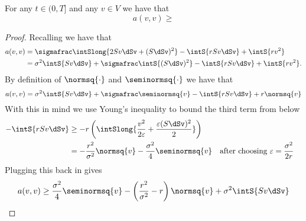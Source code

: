 
\begin{prop}
    For any $t \in (0,T]$ and any $v \in V$ we have that
    \begin{equation*}
        a(v,v) \geq 
    \end{equation*}
    \begin{proof}
        Recalling  we have that
        \begin{align*}
            a(v,v) &= \sigmafrac \intSlong{2Sv \dSv + (S\dSv)^2} - \intS{r S v \dSv} + \intS{r  v^2} \\
            &=  \sigma^2 \intS{Sv \dSv} + \sigmafrac \intS{(S\dSv)^2} - \intS{r S v \dSv} + \intS{r  v^2}.
        \end{align*}
        By definition of $\normsq{\cdot}$ and $\seminormsq{\cdot}$ we have that
        \begin{equation*}
            a(v,v) = \sigma^2 \intS{Sv \dSv} + \sigmafrac \seminormsq{v} - \intS{r S v \dSv} + r \normsq{v}
        \end{equation*}
        With this in mind we use Young's inequality to bound the third term from below
        \begin{align*}
            - \intS{r S v \dSv} & \geq -r \left( \intSlong{\frac{v^2}{2 \varepsilon} + \frac{\varepsilon (S\dSv)^2}{2}}\right)\\
            & = - \frac{r^2}{\sigma^2} \normsq{v} - \frac{\sigma^2}{4}\seminormsq{v}  && \text{after choosing $\varepsilon=\frac{\sigma^2}{2r}$}
        \end{align*}
        Plugging this back in gives
        \begin{equation*}
            a(v,v) \geq \frac{\sigma^2}{4}\seminormsq{v} - \left(\frac{r^2}{\sigma^2} - r \right)\normsq{v} + \sigma^2 \intS{Sv \dSv} 
        \end{equation*}
        



\end{proof}
\end{prop}
